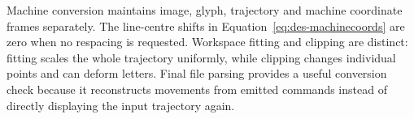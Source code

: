 Machine conversion maintains image, glyph, trajectory and machine coordinate frames separately. The line-centre shifts in Equation~\ref{eq:des-machinecoords} are zero when no respacing is requested. Workspace fitting and clipping are distinct: fitting scales the whole trajectory uniformly, while clipping changes individual points and can deform letters. Final file parsing provides a useful conversion check because it reconstructs movements from emitted commands instead of directly displaying the input trajectory again.
\FloatBarrier
